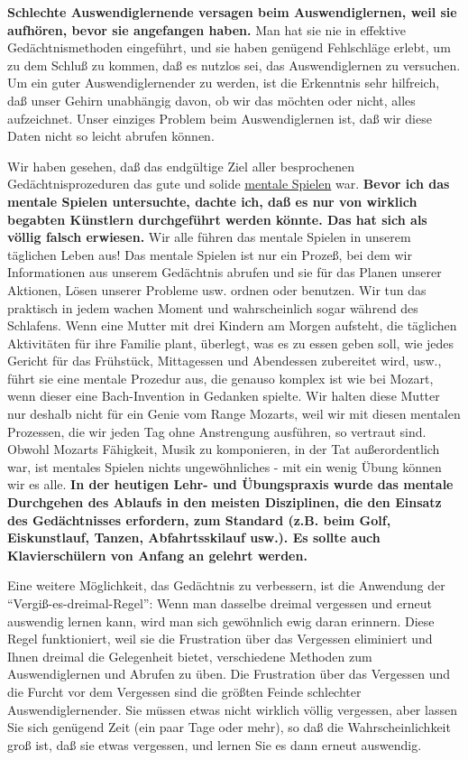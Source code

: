 \textbf{Schlechte Auswendiglernende versagen beim Auswendiglernen, weil sie aufhören, bevor sie angefangen haben.}
Man hat sie nie in effektive Gedächtnismethoden eingeführt, und sie haben genügend Fehlschläge erlebt, um zu dem Schluß zu kommen, daß es nutzlos sei, das Auswendiglernen zu versuchen.
Um ein guter Auswendiglernender zu werden, ist die Erkenntnis sehr hilfreich, daß unser Gehirn unabhängig davon, ob wir das möchten oder nicht, alles aufzeichnet.
Unser einziges Problem beim Auswendiglernen ist, daß wir diese Daten nicht so leicht abrufen können.

Wir haben gesehen, daß das endgültige Ziel aller besprochenen Gedächtnisprozeduren das gute und solide \hyperlink{c1ii12mental}{mentale Spielen} war.
\textbf{Bevor ich das mentale Spielen untersuchte, dachte ich, daß es nur von wirklich begabten Künstlern durchgeführt werden könnte.
Das hat sich als völlig falsch erwiesen.}
Wir alle führen das mentale Spielen in unserem täglichen Leben aus!
Das mentale Spielen ist nur ein Prozeß, bei dem wir Informationen aus unserem Gedächtnis abrufen und sie für das Planen unserer Aktionen, Lösen unserer Probleme usw. ordnen oder benutzen.
Wir tun das praktisch in jedem wachen Moment und wahrscheinlich sogar während des Schlafens.
Wenn eine Mutter mit drei Kindern am Morgen aufsteht, die täglichen Aktivitäten für ihre Familie plant, überlegt, was es zu essen geben soll, wie jedes Gericht für das Frühstück, Mittagessen und Abendessen zubereitet wird, usw., führt sie eine mentale Prozedur aus, die genauso komplex ist wie bei Mozart, wenn dieser eine Bach-Invention in Gedanken spielte.
Wir halten diese Mutter nur deshalb nicht für ein Genie vom Range Mozarts, weil wir mit diesen mentalen Prozessen, die wir jeden Tag ohne Anstrengung ausführen, so vertraut sind.
Obwohl Mozarts Fähigkeit, Musik zu komponieren, in der Tat außerordentlich war, ist mentales Spielen nichts ungewöhnliches - mit ein wenig Übung können wir es alle.
\textbf{In der heutigen Lehr- und Übungspraxis wurde das mentale Durchgehen des Ablaufs in den meisten Disziplinen, die den Einsatz des Gedächtnisses erfordern, zum Standard (z.B. beim Golf, Eiskunstlauf, Tanzen, Abfahrtsskilauf usw.).
Es sollte auch Klavierschülern von Anfang an gelehrt werden.}

Eine weitere Möglichkeit, das Gedächtnis zu verbessern, ist die Anwendung der \enquote{Vergiß-es-dreimal-Regel}: Wenn man dasselbe dreimal vergessen und erneut auswendig lernen kann, wird man sich gewöhnlich ewig daran erinnern.
Diese Regel funktioniert, weil sie die Frustration über das Vergessen eliminiert und Ihnen dreimal die Gelegenheit bietet, verschiedene Methoden zum Auswendiglernen und Abrufen zu üben.
Die Frustration über das Vergessen und die Furcht vor dem Vergessen sind die größten Feinde schlechter Auswendiglernender.
Sie müssen etwas nicht wirklich völlig vergessen, aber lassen Sie sich genügend Zeit (ein paar Tage oder mehr), so daß die Wahrscheinlichkeit groß ist, daß sie etwas vergessen, und lernen Sie es dann erneut auswendig.

